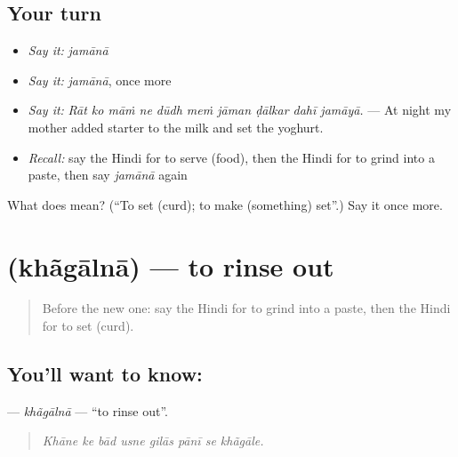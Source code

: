 \subsection*{Your turn}
\begin{itemize}
\raggedright
  \item \emph{Say it:} \emph{jamānā}
  \item \emph{Say it:} \emph{jamānā}, once more
  \item \emph{Say it:} \emph{Rāt ko māṁ ne dūdh meṁ jāman ḍālkar dahī jamāyā.} — At night my mother added starter to the milk and set the yoghurt.
  \item \emph{Recall:} say the Hindi for to serve (food), then the Hindi for to grind into a paste, then say \emph{jamānā} again
\end{itemize}

\begin{tcolorbox}[breakable,colback=teal!4,colframe=teal!35!black,title={Before you move on}]
What does  mean? (\textquotedblleft{}To set (curd); to make (something) set\textquotedblright{}.) Say it once more.
\end{tcolorbox}
\section[\texorpdfstring{\hi{खँगालना} (khãgālnā)}{खँगालना (khãgālnā)}]{ (khãgālnā) — to rinse out}

\label{lesson:HI-C524-khagalna}



\begin{quote}
Before the new one: say the Hindi for to grind into a paste, then the Hindi for to set (curd).
\end{quote}

\subsection*{You'll want to know: }
\textbf{} — \emph{khãgālnā} — \textquotedblleft{}to rinse out\textquotedblright{}.

\begin{quote}
       
\end{quote}

\begin{quote}
\emph{Khāne ke bād usne gilās pānī se khãgāle.}
\end{quote}


